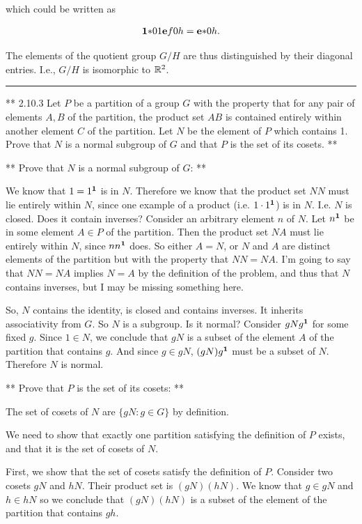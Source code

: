 which could be written as

\begin{align*}
\mathbf{1}{*}
    {0}{1} \mathbf{e}{f}
               {0}{h} = \mathbf{e}{*}
                            {0}{h}.
\end{align*}

The elements of the quotient group $G/H$ are thus distinguished by their
diagonal entries. I.e., $G/H$ is isomorphic to $\mathbb{R}^2$.


\hrule

** 2.10.3 Let $P$ be a partition of a group $G$ with the property that for any
pair of elements $A, B$ of the partition, the product set $AB$ is contained
entirely within another element $C$ of the partition. Let $N$ be the element of
$P$ which contains 1. Prove that $N$ is a normal subgroup of $G$ and that $P$
is the set of its cosets. **

** Prove that $N$ is a normal subgroup of $G$: **

We know that $1 = 1^{\mathbf 1}$ is in $N$. Therefore we know that the product set $NN$
must lie entirely within $N$, since one example of a product
(i.e. $1\cdot1^{\mathbf 1}$) is in $N$. I.e. $N$ is closed. Does it contain inverses?
Consider an arbitrary element $n$ of $N$. Let $n^{\mathbf 1}$ be in some element $A \in
P$ of the partition. Then the product set $NA$ must lie entirely within $N$,
since $nn^{\mathbf 1}$ does. So either $A = N$, or $N$ and $A$ are distinct elements of
the partition but with the property that $NN = NA$. I'm going to say that $NN =
NA$ implies $N = A$ by the definition of the problem, and thus that $N$
contains inverses, but I may be missing something here.

So, $N$ contains the identity, is closed and contains inverses. It inherits
associativity from $G$. So $N$ is a subgroup. Is it normal? Consider $gNg^{\mathbf 1}$
for some fixed $g$. Since $1 \in N$, we conclude that $gN$ is a subset of the
element $A$ of the partition that contains $g$. And since $g \in gN$,
$(gN)g^{\mathbf 1}$ must be a subset of $N$. Therefore $N$ is normal.

** Prove that $P$ is the set of its cosets: **

The set of cosets of $N$ are $\{gN: g \in G\}$ by definition.

We need to show that exactly one partition satisfying the definition of $P$
exists, and that it is the set of cosets of $N$.

First, we show that the set of cosets satisfy the definition of $P$. Consider
two cosets $gN$ and $hN$. Their product set is $(gN)(hN)$. We know that $g \in
gN$ and $h \in hN$ so we conclude that $(gN)(hN)$ is a subset of the element of
the partition that contains $gh$.


